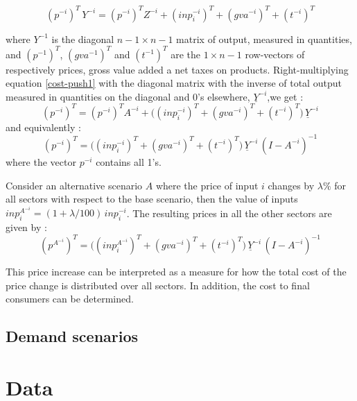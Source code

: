 \documentclass[12pt,english]{article}
\begin{document}
\begin{equation}
(p^{-i})^T \, Y^{-i} = (p^{-i})^T Z^{-i} + (inp^{-i}_i)^T + (gva^{-i})^T + (t^{-i})^T \label{cost-push1}
\end{equation}

where $Y^{-1}$ is the diagonal $n-1 \times n-1$ matrix of output, measured in quantities, and $(p^{-1})^T$, $(gva^{-1})^T$  and $(t^{-1})^T$ are the $1 \times n-1$ row-vectors of respectively prices, gross value added a net taxes on products. Right-multiplying equation \ref{cost-push1} with the diagonal matrix with the inverse of total output measured in quantities on the diagonal and 0's elsewhere, $\underline{Y}^{-i}$,we get :
\begin{equation}
(p^{-i})^T  = (p^{-i})^T A^{-i} + \Big((inp^{-i}_i)^T + (gva^{-i})^T + (t^{-i})^T \Big)\, \underline{Y}^{-i} \label{cost-push2}
\end{equation}
and equivalently :
\begin{equation}
(p^{-i})^T  =  \Big((inp^{-i}_i)^T + (gva^{-i})^T + (t^{-i})^T \Big)\, \underline{Y}^{-i} \, (I - A^{-i})^{-1} \label{cost-push3}
\end{equation}
where the vector $p^{-i}$ contains all 1's.

Consider an alternative scenario $A$ where the price of input $i$ changes by $\lambda\%$ for all sectors with respect to the base scenario, then the value of inputs $inp^{A^{-i}}_{i} = (1+\lambda/100)\, inp^{-i}_i$. The resulting prices in all the other sectors are given by :
\begin{equation}
(p^{A^{-i}})^T  =  \Big((inp^{A^{-i}}_i)^T + (gva^{-i})^T + (t^{-i})^T \Big)\, \underline{Y}^{-i} \, (I - A^{-i})^{-1} \label{cost-push-scen}
\end{equation}

This price increase can be interpreted as a measure for how the total cost of the price change is distributed over all sectors. In addition, the cost to final consumers can be determined. 

\subsection{Demand scenarios}



\section{Data}
\end{document}
